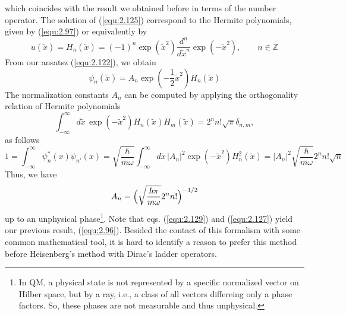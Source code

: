 which coincides with the result we obtained before in terms
of the number operator. The solution of (\ref{equ:2.125})
correspond to the Hermite polynomials, given by
(\ref{equ:2.97}) or equivalently by
\begin{equation}
  u(\tilde{x}) = H_n(\tilde{x}) = (-1)^n \exp(\tilde{x}^2)
  \frac{d^n}{d\tilde{x}^n} \exp(-\tilde{x}^2), \qquad n \in
  \mathbb{Z}
  \label{equ:2.126}
\end{equation}
From our ansatsz (\ref{equ:2.122}), we obtain
\begin{equation}
  \psi_n(\tilde{x}) = A_n
  \exp(-\frac{1}{2}\tilde{x}^2)H_n(\tilde{x})
  \label{equ:2.127}
\end{equation}
The normalization constants $A_n$ can be computed by
applying the orthogonality relation of Hermite polynomials
\begin{equation}
  \int_{-\infty}^{\infty} d\tilde{x} \,
  \exp(-\tilde{x}^2) H_n(\tilde{x}) H_m(\tilde{x}) = 2^n n!
  \sqrt{\pi} \delta_{n,m},
  \label{equ:2.128}
\end{equation}
as follows
$$
1 = \int_{-\infty}^{\infty} \psi_n^*(x) \psi_{n'} (x) =
\sqrt{\frac{\hbar}{m\omega}} \int_{-\infty}^{\infty}
d\tilde{x} \, |A_n|^2 \exp(-\tilde{x}^2) H_n^2(\tilde{x}) =
|A_n|^2 \sqrt{\frac{\hbar}{m\omega}} 2^n n! \sqrt{n}
$$
Thus, we have
\begin{equation}
  A_n = \Bigl(\sqrt{\frac{\hbar \pi}{m\omega}}2^n n!\Bigr)^{-1/2}
  \label{equ:2.129}
\end{equation}
up to an unphysical phase\footnote{In QM, a physical state
is not represented by a specific normalized vector on Hilber
space, but by a ray, i.e., a class of all vectors differeing
only a phase factors. So, these phases are not measurable
and thus unphysical.}. Note that eqs. (\ref{equ:2.129}) and
(\ref{equ:2.127}) yield our previous result,
(\ref{equ:2.96}).
Besided the contact of this formalism with some common
mathematical tool, it is hard to identify a reason to prefer
this method before Heisenberg's method with Dirac's ladder
operators.
